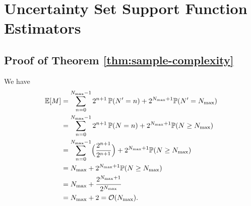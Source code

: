 \section{Uncertainty Set Support Function Estimators}
\subsection{Proof of Theorem \ref{thm:sample-complexity}} \label{proof:sample-complexity}
We have
\begin{align}
\mathbb{E}[M]&=\sum_{n=0}^{N_{\max}-1} 2^{n+1}\,\mathbb{P}(N'=n)+2^{N_{\max}+1}\mathbb{P}(N' = N_{\max})
\nonumber\\
&=\sum_{n=0}^{N_{\max}-1} 2^{n+1}\,\mathbb{P}(N=n)+2^{N_{\max}+1}\mathbb{P}(N\ge N_{\max})
\nonumber\\
&=\sum_{n=0}^{N_{\max}-1}\Bigl(\frac{ 2^{n+1}}{ 2^{n+1}}\Bigr)+2^{N_{\max}+1}\mathbb{P}(N\ge N_{\max})
\nonumber\\
&=N_{\max}+2^{N_{\max}+1}\mathbb{P}(N\ge N_{\max})
\nonumber\\
&=N_{\max}+\frac{2^{N_{\max}+1}}{2^{N_{\max}}}
\nonumber\\
&=N_{\max}+2 = \operatorname*{\mathcal{O}}(N_{\max}).
\end{align}

